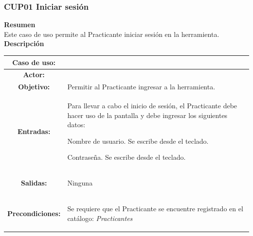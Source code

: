 \subsubsection{CUP01 Iniciar sesión}
\label{cu:CUP01}

\textbf{\textcolor[rgb]{0, 0, 0.545098}{Resumen}} \\

Este caso de uso permite al Practicante iniciar sesión en la herramienta. \\

\textbf{\textcolor[rgb]{0, 0, 0.545098}{Descripción}} \\

\begin{table}[H]
\centering
\begin{tabular}{| c | p{12 cm} |}
\hline
\rowcolor[rgb]{0.529412, 0.807843, 0.980392} {\textbf{Caso de uso:}} & \hspace{7em}{\textbf{CUP01 Iniciar sesión}}\\
\hline
\textbf{Actor:} & \nameref{act:Practicante} \\
\hline
\textbf{Objetivo:} & Permitir al Practicante ingresar a la herramienta.\\
\hline
\textbf{Entradas:} & Para llevar a cabo el inicio de sesión, el Practicante debe hacer uso de la pantalla \nameref{pant:IUP01} y debe ingresar los siguientes datos: 
	\begin{compactitem} 
			\setlength\itemsep{-0.25em}
			\item Nombre de usuario. Se escribe desde el teclado.
			\item Contraseña. Se escribe desde el teclado.
	\end{compactitem} \\
\hline
\textbf{Salidas:} & \vspace{-2mm}	%
					\begin{compactitem}
						\setlength\itemsep{-0.25em}
						\item Ninguna
					\end{compactitem}\\
\hline
\textbf{Precondiciones:} & \vspace{-2mm}	%
							\begin{compactitem}
								\setlength\itemsep{-0.25em}
								\item Se requiere que el Practicante se encuentre registrado en el catálogo: \textit{Practicantes}
							\end{compactitem}\\

\end{tabular}
\end{table}
